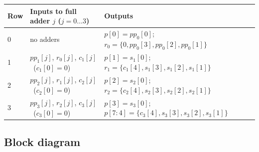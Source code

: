 \documentclass[11pt,a4paper]{article}
\begin{document}
\begin{table}[H]
\centering
\small
\begin{tabular}{lll}
\toprule
Row & Inputs to full adder $j$ ($j = 0\ldots3$) & Outputs \\
\midrule
0 & no adders & $p[0] = pp_0[0]$; \ $r_0 = \{0, pp_0[3], pp_0[2], pp_0[1]\}$ \\
1 & $pp_1[j]$, $r_0[j]$, $c_1[j]$ \ ($c_1[0] = 0$) & $p[1] = s_1[0]$; \ $r_1 = \{c_1[4], s_1[3], s_1[2], s_1[1]\}$ \\
2 & $pp_2[j]$, $r_1[j]$, $c_2[j]$ \ ($c_2[0] = 0$) & $p[2] = s_2[0]$; \ $r_2 = \{c_2[4], s_2[3], s_2[2], s_2[1]\}$ \\
3 & $pp_3[j]$, $r_2[j]$, $c_3[j]$ \ ($c_3[0] = 0$) & $p[3] = s_3[0]$; \ $p[7{:}4] = \{c_3[4], s_3[3], s_3[2], s_3[1]\}$ \\
\bottomrule
\end{tabular}
\end{table}

\subsection{Block diagram}
\end{document}
